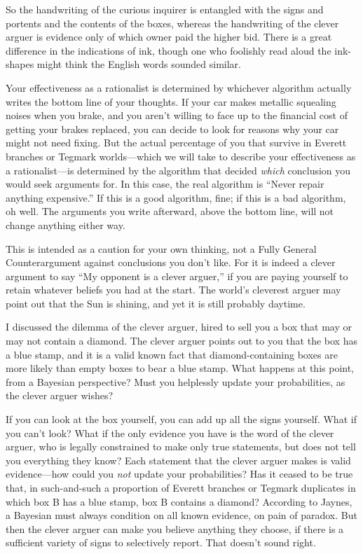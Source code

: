 {
 So the handwriting of the curious inquirer is entangled with the
signs and portents and the contents of the boxes, whereas the
handwriting of the clever arguer is evidence only of which owner paid
the higher bid. There is a great difference in the indications of ink,
though one who foolishly read aloud the ink-shapes might think the
English words sounded similar.}

{
 Your effectiveness as a rationalist is determined by whichever
algorithm actually writes the bottom line of your thoughts. If your car
makes metallic squealing noises when you brake, and you
aren't willing to face up to the financial cost of
getting your brakes replaced, you can decide to look for reasons why
your car might not need fixing. But the actual percentage of you that
survive in Everett branches or Tegmark worlds---which we will take to
describe your effectiveness as a rationalist---is determined by the
algorithm that decided \textit{which} conclusion you would seek
arguments for. In this case, the real algorithm is
``Never repair anything expensive.''
If this is a good algorithm, fine; if this is a bad algorithm, oh well.
The arguments you write afterward, above the bottom line, will not
change anything either way.}

{
 This is intended as a caution for your own thinking, not a Fully
General Counterargument against conclusions you don't
like. For it is indeed a clever argument to say ``My
opponent is a clever arguer,'' if you are paying
yourself to retain whatever beliefs you had at the start. The
world's cleverest arguer may point out that the Sun is
shining, and yet it is still probably daytime.}

\myendsectiontext


{
 I discussed the dilemma of the clever arguer, hired to sell you a
box that may or may not contain a diamond. The clever arguer points out
to you that the box has a blue stamp, and it is a valid known fact that
diamond-containing boxes are more likely than empty boxes to bear a
blue stamp. What happens at this point, from a Bayesian perspective?
Must you helplessly update your probabilities, as the clever arguer
wishes? }

{
 If you can look at the box yourself, you can add up all the signs
yourself. What if you can't look? What if the only
evidence you have is the word of the clever arguer, who is legally
constrained to make only true statements, but does not tell you
everything they know? Each statement that the clever arguer makes is
valid evidence---how could you \textit{not} update your probabilities?
Has it ceased to be true that, in such-and-such a proportion of Everett
branches or Tegmark duplicates in which box B has a blue stamp, box B
contains a diamond? According to Jaynes, a Bayesian must always
condition on all known evidence, on pain of paradox. But then the
clever arguer can make you believe anything they choose, if there is a
sufficient variety of signs to selectively report. That
doesn't sound right.}

